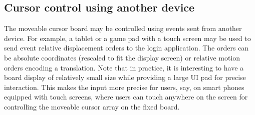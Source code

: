 \documentclass[12pt,onecolumn]{article}
\begin{document}
\subsection{Cursor control using another device}

The moveable cursor board may be controlled using events sent from another device.
For example, a tablet or a game pad with a touch screen may be used to send event relative displacement orders to the login application.
The orders can be absolute coordinates (rescaled to fit the display screen) or relative motion orders encoding a translation.
Note that in practice, it is interesting to have a board display of relatively small size while providing a large UI pad for precise interaction.
This makes the input more precise for users, say, on  smart phones equipped with touch screens, where users can touch anywhere on the screen for controlling the moveable cursor array on the fixed board.
\end{document}
